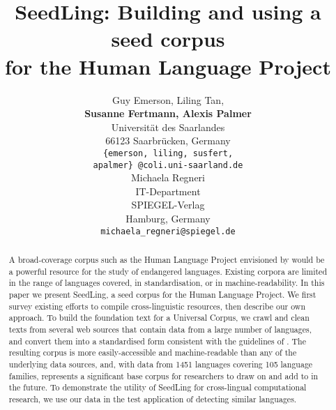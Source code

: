 \documentclass[11pt]{article}
\title{SeedLing: Building and using a seed corpus \\ for the Human Language Project}
\author{Guy Emerson, Liling Tan, \\ \textbf{Susanne Fertmann, Alexis Palmer} \\
Universität des Saarlandes \\
66123 Saarbrücken, Germany \\
{\tt \{emerson, liling, susfert,} \\ {\tt apalmer\} @coli.uni-saarland.de} \\\And
Michaela Regneri \\
IT-Department \\
SPIEGEL-Verlag \\
Hamburg, Germany \\
{\tt michaela\_regneri@spiegel.de}}
\date{}
\newcommand{\bluenote}[1]{\textcolor{blue}{[#1]}}
\begin{document}
\maketitle
\begin{abstract}
  A broad-coverage corpus such as the Human Language Project
  envisioned by  would be a powerful
  resource for the study of endangered languages.
  Existing corpora are limited in the range of languages covered, in
  standardisation, or in machine-readability. In this paper we present
  SeedLing, a seed corpus for the Human Language Project. We first
  survey existing efforts to compile cross-linguistic resources, then
  describe our own approach. To build the foundation text for a
  Universal Corpus, we crawl and clean texts from several web sources
  that contain data from a large number of languages, and convert them
  into a standardised form consistent with the guidelines of
  . The resulting corpus is more
  easily-accessible and machine-readable than any of the underlying
  data sources, and, with data from 1451 languages covering 105
  language families, represents a significant base corpus for
  researchers to draw on and add to in the future. To demonstrate the
  utility of SeedLing for cross-lingual computational research, we use our
  data in the test application of detecting similar languages.
\end{abstract}










\end{document}
